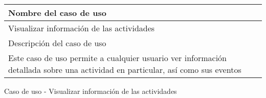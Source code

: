 \begin{identificacionCasoDeUso}
	\begin{tabular} { | p{17cm} |}

		\hline
		Nombre del caso de uso                                                                                                         \\ \hline
		Visualizar información de las actividades                                                                                      \\ \hline
		Descripción del caso de uso                                                                                                    \\ \hline
		Este caso de uso permite a cualquier usuario ver información detallada sobre una actividad en particular, así como sus eventos \\ \hline
	\end{tabular}
	\caption{Caso de uso - Visualizar información de las actividades}
\end{identificacionCasoDeUso}